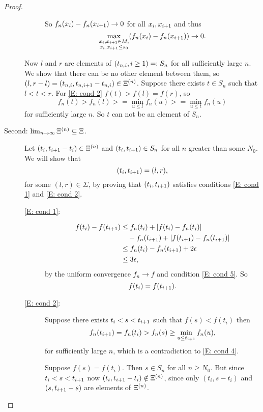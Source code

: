 \begin{proof}
\begin{description}
\begin{description}
So $f_n(x_i) - f_n(x_{i+1}) \rightarrow 0$ for all $x_i, x_{i+1}$ and thus 
\begin{equation*}
\max_{\substack{x_i, x_{i+1} \in M, \\ x_i, x_{i+1} \leq s_0}} (f_n(x_i) - f_n(x_{i+1})) \rightarrow 0.
\end{equation*}
\end{description} %
Now $l$ and $r$ are elements of $(t_{n, i}, i \geq 1) =: S_n$ for all sufficiently large $n$.
We show that there can be no other element between them, 
so $(l, r-l) = (t_{n, i}, t_{n, i+1} - t_{n, i}) \in \Xi^{(n)}$.
Suppose there exists $t \in S_n$ such that $l < t < r$.
For \eqref{E: cond 2} $f(t) > f(l) = f(r)$, so
\begin{equation*}
f_n(t) > f_n(l) >= \min_{u \leq l} f_n(u) >= \min_{u \leq t} f_n(u)
\end{equation*}
for sufficiently large $n$. So $t$ can not be an element of $S_n$.

\item[Second: $\lim_{n \rightarrow \infty} \Xi^{(n)} \subseteq \Xi$.]
Let $(t_i, t_{i+1} - t_i) \in \Xi^{(n)}$ and $(t_i, t_{i+1}) \in S_n$
for all $n$ greater than some $N_0$.
We will show that
\begin{equation}
(t_i, t_{i+1} ) = (l,r),
\end{equation}
for some $(l,r) \in \Sigma$,
by proving that $(t_i, t_{i+1})$ satisfies conditions \eqref{E: cond 1} and \eqref{E: cond 2}.


\begin{description} %
	\item[\eqref{E: cond 1}:]
\begin{equation}
\begin{aligned}
f(t_i) - f(t_{i+1}) 
&\leq f_n(t_i) + |f(t_i) - f_n(t_i)| \\
&\quad- f_n(t_{i+1}) + |f(t_{i+1}) - f_n(t_{i+1})| \\
&\leq f_n(t_i) - f_n(t_{i+1}) + 2\epsilon \\
&\leq 3\epsilon,
\end{aligned}
\end{equation}
by the uniform convergence $f_n \rightarrow f$ and condition \eqref{E: cond 5}.
So
\begin{equation}
f(t_i) = f(t_{i+1}).
\end{equation}

	\item[\eqref{E: cond 2}:]
Suppose there exists $t_i < s < t_{i+1}$ such that
$f(s) < f(t_i)$
then
\begin{equation*}
f_n(t_{i+1}) = f_n(t_i) > f_n(s) \geq \min_{u \leq t_{i+1}}f_n(u),
\end{equation*}
for sufficiently large $n$, which is a contradiction to \eqref{E: cond 4}.

Suppose $f(s) = f(t_i)$. Then $s \in S_n$ for all $n \geq N_0$.
But since $t_i < s < t_{i+1}$ now $(t_i, t_{i+1} - t_i) \notin \Xi^{(n)}$,
since only $(t_i, s - t_i)$ and $(s, t_{i+1} - s)$ are elements of $\Xi^{(n)}$.
\end{description} %
\end{description} %
\end{proof}
